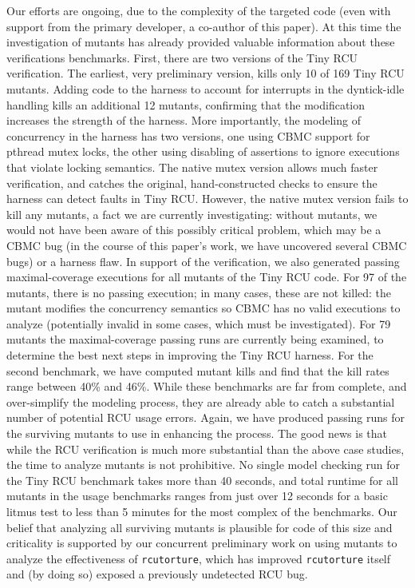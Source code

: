 \documentclass{svjour3}
\begin{document}
Our efforts are ongoing, due to the complexity of the targeted code
(even with support from the primary developer, a co-author of this
paper).  At this time the investigation of mutants has already
provided valuable information about these verifications benchmarks.
First, there are two versions of the Tiny RCU verification.  The
earliest, very preliminary version, kills only 10 of 169 Tiny RCU
mutants.  Adding code to the harness to account for interrupts in the
dyntick-idle handling kills an additional 12 mutants, confirming that
the modification increases the strength of the harness.  More
importantly, the modeling of concurrency in the harness has two
versions, one using CBMC support for pthread mutex locks, the other
using disabling of assertions to ignore executions that violate
locking semantics.  The native mutex version allows much faster
verification, and catches the original, hand-constructed checks to
ensure the harness can detect faults in Tiny RCU.  However, the native
mutex version fails to kill any mutants, a fact we are currently
investigating: without mutants, we would not have been aware of this
possibly critical problem, which may be a CBMC bug (in the course of
this paper's work, we have uncovered several CBMC bugs) or a harness
flaw.  In support of the verification, we also generated passing
maximal-coverage executions for all mutants of the Tiny RCU code.  For
97 of the mutants, there is no passing execution; in many cases, these
are not killed: the mutant modifies the concurrency semantics so CBMC
has no valid executions to analyze (potentially invalid in some cases,
which must be investigated).  For 79 mutants the maximal-coverage
passing runs are currently being examined, to determine the best next
steps in improving the Tiny RCU harness.  For the second benchmark, we
have computed mutant kills and find that the kill rates range between
40\% and 46\%.  While these benchmarks are far from complete, and
over-simplify the modeling process, they are already able to catch a
substantial number of potential RCU usage errors.  Again, we have
produced passing runs for the surviving mutants to use in enhancing
the process.  The good news is that while the RCU verification is much
more substantial than the above case studies, the time to analyze
mutants is not prohibitive.  No single model checking run for the Tiny
RCU benchmark takes more than 40 seconds, and total runtime for all
mutants in the usage benchmarks ranges from just over 12 seconds for a
basic litmus test to less than 5 minutes for the most complex of the
benchmarks.  Our belief that analyzing all surviving mutants is
plausible for code of this size and criticality is supported by our
concurrent preliminary work on using mutants to analyze the
effectiveness of {\tt rcutorture}, which has improved {\tt rcutorture}
itself and (by doing so) exposed a previously undetected RCU bug.
\end{document}
